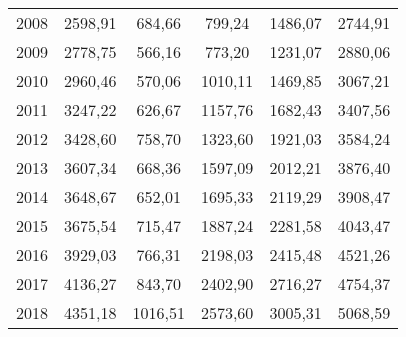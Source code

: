 \begin{center}
\begin{longtable}{|r|c|c|c|c|l|}
	2008 & 2598,91 & 684,66  & 799,24  & 1486,07 & 2744,91 \\
	2009 & 2778,75 & 566,16  & 773,20  & 1231,07 & 2880,06 \\
	2010 & 2960,46 & 570,06  & 1010,11 & 1469,85 & 3067,21 \\
	2011 & 3247,22 & 626,67  & 1157,76 & 1682,43 & 3407,56 \\
	2012 & 3428,60 & 758,70  & 1323,60 & 1921,03 & 3584,24 \\
	2013 & 3607,34 & 668,36  & 1597,09 & 2012,21 & 3876,40 \\
	2014 & 3648,67 & 652,01  & 1695,33 & 2119,29 & 3908,47 \\
	2015 & 3675,54 & 715,47  & 1887,24 & 2281,58 & 4043,47 \\
	2016 & 3929,03 & 766,31  & 2198,03 & 2415,48 & 4521,26 \\
	2017 & 4136,27 & 843,70  & 2402,90 & 2716,27 & 4754,37 \\
	2018 & 4351,18 & 1016,51 & 2573,60 & 3005,31 & 5068,59 \\ \hline
	\end{longtable}
\end{center}

